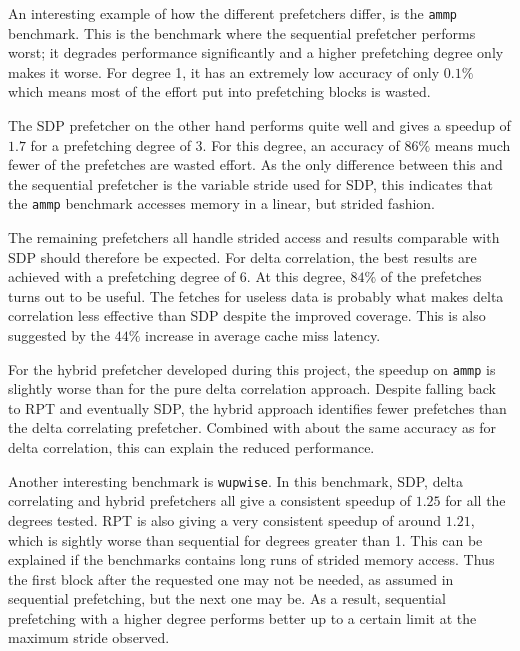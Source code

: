 An interesting example of how the different prefetchers differ, is the
\texttt{ammp} benchmark.   This is the benchmark where the sequential prefetcher performs worst; it
degrades performance significantly and a higher prefetching degree only makes
it worse.  For degree 1, it has an extremely low accuracy of only $0.1\%$ which
means most of the effort put into prefetching blocks is wasted.

The SDP prefetcher on the other hand performs quite well and gives a speedup of
$1.7$ for a prefetching degree of $3$. For this degree, an accuracy of $86\%$
means much fewer of the prefetches are wasted effort.  As the only difference
between this and the sequential prefetcher is the variable stride used for SDP,
this indicates that the \texttt{ammp} benchmark accesses memory in a linear,
but strided fashion.  

The remaining prefetchers all handle strided access and results comparable with
SDP should therefore be expected.  For delta correlation, the best results are
achieved with a prefetching degree of $6$.  At this degree, $84\%$ of the
prefetches turns out to be useful.  The fetches for useless data is probably
what makes delta correlation less effective than SDP despite the improved
coverage.
This is also suggested by the $44\%$ increase in average cache miss latency.

For the hybrid prefetcher developed during this project, the speedup on \texttt{ammp} is slightly
worse than for the pure delta correlation approach.
Despite falling back to RPT and eventually SDP, the hybrid approach identifies
fewer prefetches than the delta correlating prefetcher.
Combined with about the same accuracy as for delta correlation, this can explain
the reduced performance.

Another interesting benchmark is \texttt{wupwise}.
In this benchmark, SDP, delta correlating and hybrid prefetchers all give a
consistent speedup of $1.25$ for all the degrees tested.
RPT is also giving a very consistent speedup of around $1.21$, which is sightly
worse than sequential for degrees greater than 1.
This can be explained if the benchmarks contains long runs of strided memory
access.
Thus the first block after the requested one may not be needed, as assumed in
sequential prefetching, but the next one may be.
As a result, sequential prefetching with a higher degree performs better up to a
certain limit at the maximum stride observed.

